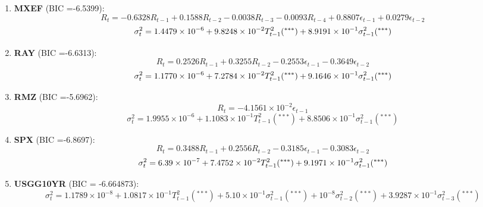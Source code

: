 \documentclass[12pt]{article}
\begin{document}
\begin{enumerate}
\item \textbf{MXEF} (BIC =-6.5399):
\begin{dmath*}
R_t = -0.6328R_{t-1}+  0.1588R_{t-2} -0.0038R_{t-3}  -0.0093R_{t-4} +
 0.8807\epsilon_{t-1} +  0.0279 \epsilon_{t-2} 
\end{dmath*}
\begin{dmath*}
\sigma_t^2  = 1.4479\times 10^{-6} + 9.8248\times 10^{-2} T_{t-1}^2(^{***}) +8.9191\times 10^{-1}  \sigma_{t-1}^2(^{***}) \\
\end{dmath*}


\item \textbf{RAY} (BIC =-6.6313):
\begin{dmath*}
R_t = 0.2526R_{t-1}+  0.3255R_{t-2} -0.2553\epsilon_{t-1} -0.3649 \epsilon_{t-2} 
\end{dmath*}
\begin{dmath*}
\sigma_t^2  = 1.1770\times 10^{-6} + 7.2784\times 10^{-2} T_{t-1}^2(^{***}) +9.1646\times 10^{-1}  \sigma_{t-1}^2(^{***}) \\
\end{dmath*}


\item \textbf{RMZ} (BIC =-5.6962):
\begin{dmath*}
R_t = -4.1561\times 10^{-2}\epsilon_{t-1} 
\end{dmath*}
\begin{dmath*}
\sigma_t^2  = 1.9955 \times 10^{-6} +1.1083\times 10^{-1} T_{t-1}^2(^{***})  +8.8506\times 10^{-1}  \sigma_{t-1}^2(^{***}) 
\end{dmath*}

\item \textbf{SPX} (BIC =-6.8697):
\begin{dmath*}
R_t =  0.3488R_{t-1}+  0.2556R_{t-2}  -0.3185\epsilon_{t-1}  -0.3083\epsilon_{t-2} 
\end{dmath*}
\begin{dmath*}
\sigma_t^2  = 6.39\times 10^{-7} + 7.4752\times 10^{-2} T_{t-1}^2(^{***}) +9.1971\times 10^{-1}  \sigma_{t-1}^2(^{***}) \\
\end{dmath*}


\item \textbf{USGG10YR} (BIC = -6.664873):
\begin{dmath*}
\sigma_t^2  = 1.1789 \times 10^{-8} +1.0817\times 10^{-1} T_{t-1}^2 (^{***}) +5.10\times 10^{-1}  \sigma_{t-1}^2(^{***}) 
+10^{-8}  \sigma_{t-2}^2(^{***}) 
+3.9287\times 10^{-1}  \sigma_{t-3}^2(^{***}) 
\end{dmath*}
\end{enumerate}
\end{document}
